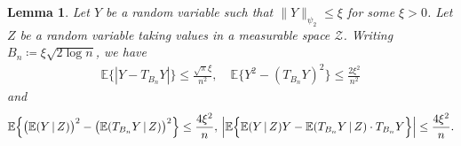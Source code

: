 \documentclass[12pt]{article}
\newtheorem{lemma}[thm]{Lemma}
\begin{document}
\begin{lemma} \label{lemma:truncation-bias}
    Let $Y$ be a random variable such that $\|Y\|_{\psi_2} \leq \xi$ for some $\xi > 0$.  Let $Z$ be a random variable taking values in a measurable space $\mathcal{Z}$.  Writing $B_n\coloneqq \xi\sqrt{2\log n}$, we have
    \begin{align*}
        \mathbb{E}\{|Y - T_{B_n}Y|\} \leq \frac{\sqrt{\pi}\xi}{n^2}, \quad \mathbb{E}\bigl\{Y^2 - (T_{B_n}Y)^2\bigr\} \leq \frac{2\xi^2}{n^2}
    \end{align*}
    and
    \begin{align*}
        \mathbb{E}\Bigl\{\bigl(\mathbb{E}(Y\,|\,Z)\bigr)^2 - \bigl(\mathbb{E}(T_{B_n}Y\,|\,Z)\bigr)^2 \Bigr\} \leq \frac{4\xi^2}{n}, \, \Bigl|\mathbb{E}\Bigl\{\mathbb{E}(Y\,|\,Z)Y - \mathbb{E}(T_{B_n}Y\,|\,Z) \cdot T_{B_n}Y\Bigr\}\Bigr| \leq \frac{4\xi^2}{n}.
    \end{align*}
\end{lemma}
\end{document}
